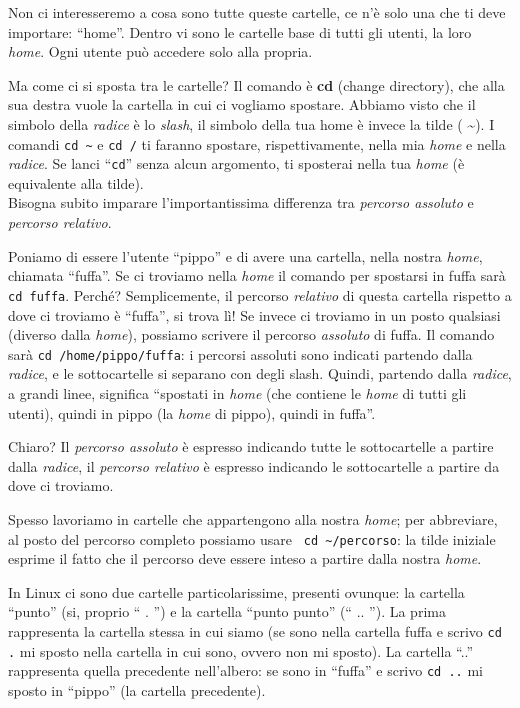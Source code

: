 Non ci interesseremo a cosa sono tutte queste cartelle, ce n'è solo una che ti deve importare: ``home''. Dentro vi sono le cartelle base di tutti gli utenti, la loro \emph{home}. Ogni utente può accedere solo alla propria. 

Ma come ci si sposta tra le cartelle? Il comando è \textbf{cd} (change directory), che alla sua destra vuole la cartella in cui ci vogliamo spostare. Abbiamo visto che il simbolo della \emph{radice} è lo \emph{slash}, il simbolo della tua home è invece la tilde ( \textasciitilde). I comandi \verb|cd ~| e \verb|cd /| ti faranno spostare, rispettivamente, nella mia \emph{home} e nella \emph{radice}. Se lanci ``\verb|cd|'' senza alcun argomento, ti sposterai nella tua \emph{home} (è equivalente alla tilde). \\

Bisogna subito imparare l'importantissima differenza tra \emph{percorso assoluto} e \emph{percorso relativo}. 

Poniamo di essere l'utente ``pippo'' e di avere una cartella, nella nostra \emph{home}, chiamata ``fuffa''. Se ci troviamo nella \emph{home} il comando per spostarsi in fuffa sarà \verb|cd fuffa|. Perché? Semplicemente, il percorso \emph{relativo} di questa cartella rispetto a dove ci troviamo è ``fuffa'', si trova lì! Se invece ci troviamo in un posto qualsiasi (diverso dalla \emph{home}), possiamo scrivere il percorso \emph{assoluto} di fuffa. Il comando sarà \verb|cd /home/pippo/fuffa|: i percorsi assoluti sono indicati partendo dalla \emph{radice}, e le sottocartelle si separano con degli slash. Quindi, partendo dalla \emph{radice}, a grandi linee, significa ``spostati in \emph{home} (che contiene le \emph{home} di tutti gli utenti), quindi in pippo (la \emph{home} di pippo), quindi in fuffa''. 

Chiaro? Il \emph{percorso assoluto} è espresso indicando tutte le sottocartelle a partire dalla \emph{radice}, il \emph{percorso relativo} è espresso indicando le sottocartelle a partire da dove ci troviamo. 

Spesso lavoriamo in cartelle che appartengono alla nostra \emph{home}; per abbreviare, al posto del percorso completo possiamo usare \verb| cd ~/percorso|: la tilde iniziale esprime il fatto che il percorso deve essere inteso a partire dalla nostra \emph{home}.

In Linux ci sono due cartelle particolarissime, presenti ovunque: la cartella ``punto'' (si, proprio `` . '') e la cartella ``punto punto'' (`` .. ''). La prima rappresenta la cartella stessa in cui siamo (se sono nella cartella fuffa e scrivo \verb|cd .| mi sposto nella cartella in cui sono, ovvero non mi sposto). La cartella ``..'' rappresenta quella precedente nell'albero: se sono in ``fuffa'' e scrivo \verb|cd ..| mi sposto in ``pippo'' (la cartella precedente).

